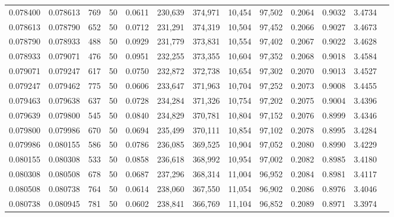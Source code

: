 \begin{tabular}{rrrrrrrrrrrrr}
0.078400 & 0.078613 &   769 &  50 &                                     0.0611 & 230,639 & 374,971 &  10,454 &  97,502 & 0.2064 & 0.9032 & 3.4734 \\
0.078613 & 0.078790 &   652 &  50 &                                     0.0712 & 231,291 & 374,319 &  10,504 &  97,452 & 0.2066 & 0.9027 & 3.4673 \\
0.078790 & 0.078933 &   488 &  50 &                                     0.0929 & 231,779 & 373,831 &  10,554 &  97,402 & 0.2067 & 0.9022 & 3.4628 \\
0.078933 & 0.079071 &   476 &  50 &                                     0.0951 & 232,255 & 373,355 &  10,604 &  97,352 & 0.2068 & 0.9018 & 3.4584 \\
0.079071 & 0.079247 &   617 &  50 &                                     0.0750 & 232,872 & 372,738 &  10,654 &  97,302 & 0.2070 & 0.9013 & 3.4527 \\
0.079247 & 0.079462 &   775 &  50 &                                     0.0606 & 233,647 & 371,963 &  10,704 &  97,252 & 0.2073 & 0.9008 & 3.4455 \\
0.079463 & 0.079638 &   637 &  50 &                                     0.0728 & 234,284 & 371,326 &  10,754 &  97,202 & 0.2075 & 0.9004 & 3.4396 \\
0.079639 & 0.079800 &   545 &  50 &                                     0.0840 & 234,829 & 370,781 &  10,804 &  97,152 & 0.2076 & 0.8999 & 3.4346 \\
0.079800 & 0.079986 &   670 &  50 &                                     0.0694 & 235,499 & 370,111 &  10,854 &  97,102 & 0.2078 & 0.8995 & 3.4284 \\
0.079986 & 0.080155 &   586 &  50 &                                     0.0786 & 236,085 & 369,525 &  10,904 &  97,052 & 0.2080 & 0.8990 & 3.4229 \\
0.080155 & 0.080308 &   533 &  50 &                                     0.0858 & 236,618 & 368,992 &  10,954 &  97,002 & 0.2082 & 0.8985 & 3.4180 \\
0.080308 & 0.080508 &   678 &  50 &                                     0.0687 & 237,296 & 368,314 &  11,004 &  96,952 & 0.2084 & 0.8981 & 3.4117 \\
0.080508 & 0.080738 &   764 &  50 &                                     0.0614 & 238,060 & 367,550 &  11,054 &  96,902 & 0.2086 & 0.8976 & 3.4046 \\
0.080738 & 0.080945 &   781 &  50 &                                     0.0602 & 238,841 & 366,769 &  11,104 &  96,852 & 0.2089 & 0.8971 & 3.3974 \\

\end{tabular}
